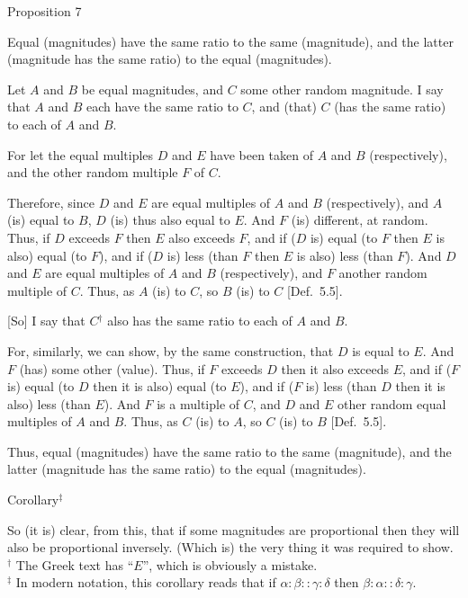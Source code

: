 
\begin{center}
{\large Proposition 7}
\end{center}

Equal (magnitudes) have the same ratio to the same 
(magnitude), and the latter (magnitude has the same ratio) to the equal
(magnitudes).

Let $A$ and $B$ be equal magnitudes, and $C$ some other random magnitude.
I say that $A$ and $B$ each have the same ratio to $C$, and (that) $C$ (has the same
ratio) to each of $A$ and $B$.

\epsfysize=0.75in
\centerline{}

For let the equal multiples $D$ and $E$ have been taken of $A$ and $B$ (respectively), and the other
random multiple $F$ of $C$.

Therefore, since $D$ and $E$ are equal multiples of $A$ and $B$ (respectively), and
$A$ (is) equal to $B$, $D$ (is) thus also equal to $E$. And $F$ (is) different, at random.
Thus, if $D$ exceeds $F$ then $E$ also exceeds $F$, and if ($D$ is) equal (to $F$ then
$E$ is also) equal (to $F$), and if ($D$ is) less (than $F$ then
$E$ is also) less (than $F$). And $D$ and $E$ are equal multiples of $A$ and $B$ (respectively), and $F$ another random multiple of $C$. Thus, as $A$ (is) to
$C$, so $B$ (is) to $C$ [Def.~5.5].

\mbox{[}So] I say that $C$$^\dag$ also has the same ratio to each of $A$ and $B$.

For, similarly,  we can show, by the same construction, that $D$ is equal to $E$.
And $F$ (has) some other (value). Thus, if $F$ exceeds $D$ then it also exceeds $E$,
and if ($F$ is) equal (to $D$  then it is also) equal (to $E$), and if ($F$ is) less (than $D$ then it is also) less (than $E$). And $F$ is a multiple of $C$, and $D$ and $E$ other random equal
multiples of $A$ and $B$. Thus, as $C$ (is) to $A$, so $C$ (is)
to $B$  [Def.~5.5]. 

Thus, equal (magnitudes) have the same ratio to the same 
(magnitude), and the latter (magnitude has the same ratio) to the equal
(magnitudes).\\

\begin{center}
\large{Corollary}$^\ddag$
\end{center}\vspace*{-7pt}

So (it is) clear, from this, that if some magnitudes are proportional
then they will also be proportional inversely. (Which is) the very thing it was
required to show.
{\footnotesize \noindent$^\dag$ The Greek text has ``$E$'', which is obviously a mistake.\\[0.5ex]
$^\ddag$ In modern notation, this corollary reads that if $\alpha:\beta::\gamma:\delta$ then
$\beta:\alpha::\delta:\gamma$.}

